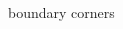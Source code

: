 \documentclass[12pt,a4paper,oneside,openright]{book}
\begin{document}
\begin{CJK}{UTF8}{}
\begin{figure}[htbp]
\begin{center}
\begin{minipage}[t]{.32\textwidth}
    \end{minipage}\medskip\\
    \begin{minipage}[t]{.32\textwidth}
      \begin{center}
        \\
        boundary corners
      \end{center}
    \end{minipage}
    \begin{minipage}[t]{.32\textwidth}
      \begin{center}
        \\

\end{center}
\end{minipage}
\end{center}
\end{figure}
\end{CJK}
\end{document}
